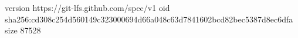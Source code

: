 version https://git-lfs.github.com/spec/v1
oid sha256:cd308c254d560149c323000694d66a048c63d7841602bcd82bec5387d8ec6dfa
size 87528
